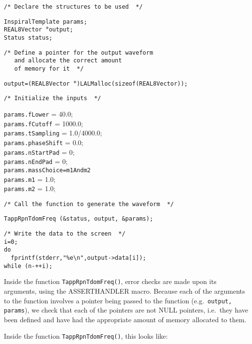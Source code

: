 \documentclass[12pt]{article}
\begin{document}
\noindent
\begin{verbatim}
/* Declare the structures to be used  */
\end{verbatim}
\texttt{InspiralTemplate params;} \\
\texttt{REAL8Vector $\ast$output;} \\
\texttt{Status status;} \\
\begin{verbatim}
/* Define a pointer for the output waveform 
   and allocate the correct amount 
   of memory for it  */
\end{verbatim}
\texttt{output=(REAL8Vector $\ast$)LALMalloc(sizeof(REAL8Vector));} \\
\begin{verbatim}
/* Initialize the inputs  */
\end{verbatim}
\texttt{params.fLower} = 40.0;\\
\texttt{params.fCutoff} = 1000.0; \\
\texttt{params.tSampling} = 1.0/4000.0; \\
\texttt{params.phaseShift} = 0.0; \\
\texttt{params.nStartPad} = 0; \\
\texttt{params.nEndPad} = 0; \\
\texttt{params.massChoice=m1Andm2}\\
\texttt{params.m1} = 1.0; \\
\texttt{params.m2} = 1.0; \\
\begin{verbatim}
/* Call the function to generate the waveform  */
\end{verbatim}
\texttt{TappRpnTdomFreq (\&status, output, \&params);}
\begin{verbatim}
/* Write the data to the screen  */
i=0; 
do 
  fprintf(stderr,"%e\n",output->data[i]); 
while (n-++i);
\end{verbatim}

Inside the function \texttt{TappRpnTdomFreq()}, error checks are made upon its arguments, using the ASSERTHANDLER macro. Because each of the arguments to the function involves a pointer being passed to the function (e.g.\ \texttt{output, params}), we check that each of the pointers are not NULL pointers, i.e.\ they have been defined and have had the appropriate amount of memory allocated to them.

Inside the function \texttt{TappRpnTdomFreq()}, this looks like:

\vspace{5mm}
\end{document}
